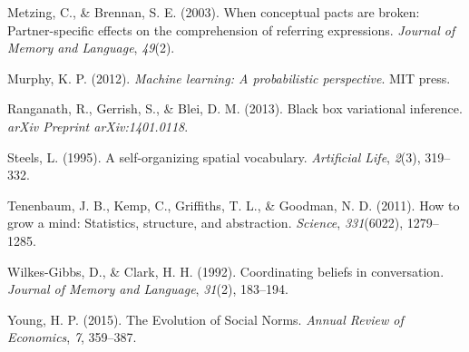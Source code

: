 \documentclass[10pt, letterpaper]{article}
\begin{document}
\leavevmode\hypertarget{ref-metzing_when_2003}{}%
Metzing, C., \& Brennan, S. E. (2003). When conceptual pacts are broken:
Partner-specific effects on the comprehension of referring expressions.
\emph{Journal of Memory and Language}, \emph{49}(2).

\leavevmode\hypertarget{ref-murphy2012machine}{}%
Murphy, K. P. (2012). \emph{Machine learning: A probabilistic
perspective}. MIT press.

\leavevmode\hypertarget{ref-RanganathGerrishBlei13_BlackBoxVariationalInference}{}%
Ranganath, R., Gerrish, S., \& Blei, D. M. (2013). Black box variational
inference. \emph{arXiv Preprint arXiv:1401.0118}.

\leavevmode\hypertarget{ref-steels_self-organizing_1995}{}%
Steels, L. (1995). A self-organizing spatial vocabulary.
\emph{Artificial Life}, \emph{2}(3), 319--332.

\leavevmode\hypertarget{ref-tenenbaum_how_2011}{}%
Tenenbaum, J. B., Kemp, C., Griffiths, T. L., \& Goodman, N. D. (2011).
How to grow a mind: Statistics, structure, and abstraction.
\emph{Science}, \emph{331}(6022), 1279--1285.

\leavevmode\hypertarget{ref-wilkes-gibbs_coordinating_1992}{}%
Wilkes-Gibbs, D., \& Clark, H. H. (1992). Coordinating beliefs in
conversation. \emph{Journal of Memory and Language}, \emph{31}(2),
183--194.

\leavevmode\hypertarget{ref-young_evolution_2015}{}%
Young, H. P. (2015). The Evolution of Social Norms. \emph{Annual Review
of Economics}, \emph{7}, 359--387.


\end{document}
